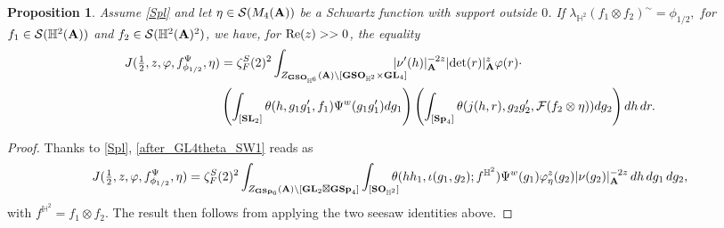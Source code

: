 \documentclass[11pt, reqno]{amsart}
\theoremstyle{plain}
\newtheorem{proposition}[theorem]{Proposition}
\theoremstyle{definition}
\theoremstyle{remark}
\theoremstyle{plain}
\def\SL{{\mathbf{SL}}}
\def\A{{\bf A}}
\def\det{\mathrm{det}}
\def\GSp{{\mathbf{GSp}}}
\def\Sp{{\mathbf{Sp}}}
\def\SO{{\mathbf{SO}}}
\def\GSO{{\mathbf{GSO}}}
\def\GL{\mathbf{GL}}
\begin{document}
\begin{proposition}\label{FinalPropSct83}
Assume \eqref{Spl} and let $\eta \in \mathcal{S}(M_4(\A))$ be a Schwartz function with support outside $0$. If $ \lambda_{\mathbb{H}^2}(f_1 \otimes f_2)^{\sim} = \phi_{1/2},$ for $ f_1\in \mathcal{S}(\mathbb{H}^2(\A))$ and $f_2 \in \mathcal{S}(\mathbb{H}^2(\A)^2)$, we have, for ${\rm Re}(z)>>0$, the equality
\begin{align*}
    J(\tfrac{1}{2},z,\varphi,f^\Psi_{\phi_{1/2}}, \eta) &= \zeta^S_F(2)^2  \int_{Z_{\GSO_{\mathbb{H}^6}}(\A)\backslash [\mathbf{GSO}_{\mathbb{H}^2}\times \GL_4]}   \!\!\!\!\!\!\!\!|\nu'(h)|_\A^{-2z}|\det(r)|^{z}_{\A} \varphi(r) \cdot \\ & \left(\int_{[\SL_2]} \theta(h, g_1g_1',f_1) \Psi^w( g_1g_1' )dg_1\right) \left(\int_{[\Sp_4]} \theta(j(h,r), g_2g_2', \mathcal{F}(f_2\otimes \eta)) d g_2\right)dh\, d r. 
\end{align*}
 
\end{proposition}
\begin{proof}
   Thanks to \eqref{Spl}, \eqref{after_GL4theta_SW1} reads as \small
\begin{align*}
  J(\tfrac{1}{2},z,\varphi,f^\Psi_{\phi_{1/2}}, \eta)=\zeta^S_F(2)^2  \int_{Z_{\GSp_6}(\A)\backslash [\GL_2\boxtimes \GSp_4]} \int_{[\SO_{\mathbb{H}^2}]}\!\!\!\!\! \theta(h h_1, \iota( g_1  , g_2) ; f^{\mathbb{H}^2}) \Psi^w( g_1 ) \varphi^z_\eta(g_2) |\nu(g_2)|_\A^{-2z}  \, d h \, dg_1\,dg_2,
\end{align*}
\normalsize
with $f^{\mathbb{H}^2} = f_1 \otimes f_2$. The result then follows from applying the two seesaw identities above.
\end{proof}
\end{document}
